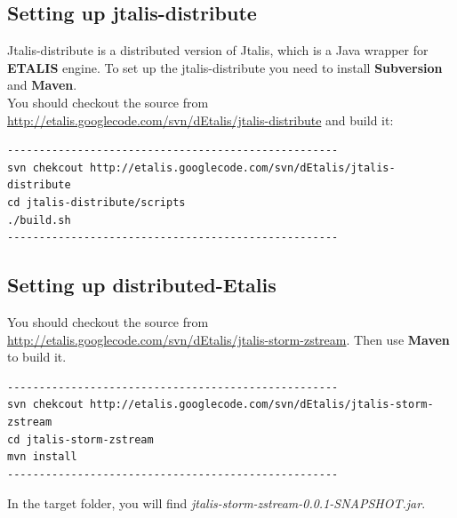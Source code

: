 \documentclass[a4paper, 12pt]{article}
\begin{document}
\subsection{Setting up jtalis-distribute}
Jtalis-distribute is a distributed version of Jtalis, which is a Java wrapper for \textbf{ETALIS} \cite{web:etalis} engine. To set up the jtalis-distribute you need to install \textbf{Subversion} and \textbf{Maven}.\\
You should checkout the source from \url{http://etalis.googlecode.com/svn/dEtalis/jtalis-distribute} and build it:
\begin{lstlisting}
----------------------------------------------------
svn chekcout http://etalis.googlecode.com/svn/dEtalis/jtalis-distribute
cd jtalis-distribute/scripts
./build.sh
----------------------------------------------------
\end{lstlisting}


\subsection{Setting up distributed-Etalis}
You should checkout the source from \url{http://etalis.googlecode.com/svn/dEtalis/jtalis-storm-zstream}. Then use \textbf{Maven} to build it.
\begin{lstlisting}
----------------------------------------------------
svn chekcout http://etalis.googlecode.com/svn/dEtalis/jtalis-storm-zstream
cd jtalis-storm-zstream
mvn install
----------------------------------------------------
\end{lstlisting}
In the target folder, you will find \textit{jtalis-storm-zstream-0.0.1-SNAPSHOT.jar}.
\end{document}
